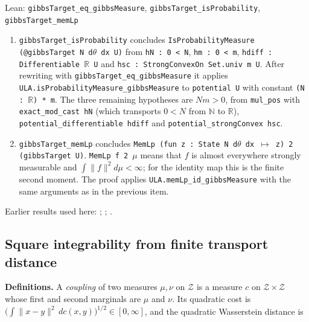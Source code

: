 \documentclass[11pt,a4paper]{report}
\begin{document}
\begin{leanbox}{Lean: \texttt{gibbsTarget\_\allowbreak{}eq\_\allowbreak{}gibbsMeasure}, \texttt{gibbsTarget\_\allowbreak{}isProbability}, \texttt{gibbsTarget\_\allowbreak{}memLp}}
\begin{enumerate}
\item \texttt{gibbs\allowbreak{}Target\_\allowbreak{}is\allowbreak{}Probability} concludes \texttt{Is\allowbreak{}Probability\allowbreak{}Measure (@gibbs\allowbreak{}Target N d\ensuremath{\theta} dx U)} from \texttt{h\allowbreak{}N : 0 < N}, \texttt{hm : 0 < m}, \texttt{hdiff : Differentiable \ensuremath{\mathbb R} U} and \texttt{hsc : Strong\allowbreak{}Convex\allowbreak{}On Set.\allowbreak{}univ m U}. After rewriting with \texttt{gibbs\allowbreak{}Target\_\allowbreak{}eq\_\allowbreak{}gibbs\allowbreak{}Measure} it applies \texttt{ULA.\allowbreak{}is\allowbreak{}Probability\allowbreak{}Measure\_\allowbreak{}gibbs\allowbreak{}Measure} to \texttt{potential U} with constant \texttt{(N : \ensuremath{\mathbb R}) * m}. The three remaining hypotheses are \(Nm>0\), from \texttt{mul\_\allowbreak{}pos} with \texttt{exact\_\allowbreak{}mod\_\allowbreak{}cast h\allowbreak{}N} (which transports \(0<N\) from \(\mathbb N\) to \(\mathbb R\)), \texttt{potential\_\allowbreak{}differentiable hdiff} and \texttt{potential\_\allowbreak{}strong\allowbreak{}Convex hsc}.

\item \texttt{gibbs\allowbreak{}Target\_\allowbreak{}mem\allowbreak{}Lp} concludes \texttt{Mem\allowbreak{}Lp (fun z : State N d\ensuremath{\theta} dx \ensuremath{\mapsto} z) 2 (gibbs\allowbreak{}Target U)}. \texttt{Mem\allowbreak{}Lp f 2 \ensuremath{\mu}} means that \(f\) is almost everywhere strongly measurable and \(\int\|f\|^2d\mu<\infty\); for the identity map this is the finite second moment. The proof applies \texttt{ULA.\allowbreak{}mem\allowbreak{}Lp\_\allowbreak{}id\_\allowbreak{}gibbs\allowbreak{}Measure} with the same arguments as in the previous item.

\end{enumerate}
\end{leanbox}


Earlier results used here: \cite[Section~3.26.13]{LangevinLean2026ULASC}; \cite[Section~3.26.15]{LangevinLean2026ULASC}; \cite[Section~3.26.3]{LangevinLean2026ULASC}.
\subsection{\texorpdfstring{Square integrability from finite transport distance}{Square integrability from finite transport distance}}
\label{report-step-IPLA-Foundations-lean-2}


\textbf{Definitions.} A \emph{coupling} of two measures \(\mu,\nu\) on \(\mathcal Z\) is a measure \(c\) on \(\mathcal Z\times\mathcal Z\) whose first and second marginals are \(\mu\) and \(\nu\). Its quadratic cost is \(\bigl(\int\|x-y\|^2\,dc(x,y)\bigr)^{1/2}\in[0,\infty]\), and the quadratic Wasserstein distance is
\end{document}
